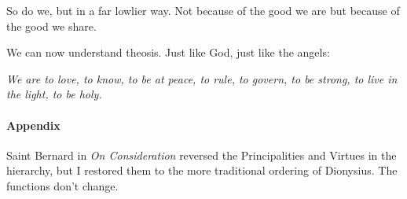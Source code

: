 \begin{quotex}
So do we, but in a far lowlier way. Not because of the good we are but because of the good we share.

\end{quotex}
We can now understand theosis. Just like God, just like the angels:

\emph{We are to love, to know, to be at peace, to rule, to govern, to be strong, to live in the light, to be holy.}

\paragraph{Appendix}
Saint Bernard in \emph{On Consideration} reversed the Principalities and Virtues in the hierarchy, but I restored them to the more traditional ordering of Dionysius. The functions don't change.



